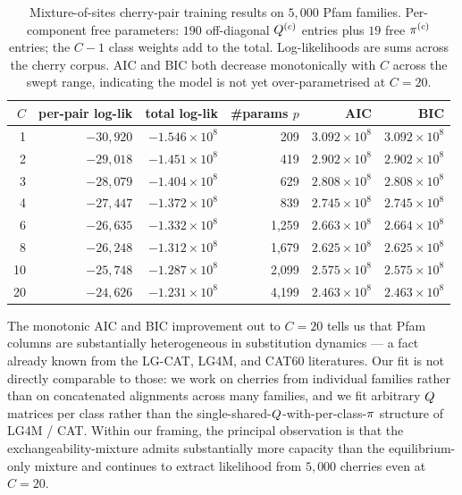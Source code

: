 \begin{table}[ht]
\centering\small
\begin{tabular}{rrrrrr}
\toprule
$C$ & per-pair log-lik & total log-lik & \#params $p$ & AIC & BIC \\
\midrule
1  & $-30{,}920$ & $-1.546 \times 10^8$ & 209  & $3.092 \times 10^8$ & $3.092 \times 10^8$ \\
2  & $-29{,}018$ & $-1.451 \times 10^8$ & 419  & $2.902 \times 10^8$ & $2.902 \times 10^8$ \\
3  & $-28{,}079$ & $-1.404 \times 10^8$ & 629  & $2.808 \times 10^8$ & $2.808 \times 10^8$ \\
4  & $-27{,}447$ & $-1.372 \times 10^8$ & 839  & $2.745 \times 10^8$ & $2.745 \times 10^8$ \\
6  & $-26{,}635$ & $-1.332 \times 10^8$ & 1{,}259 & $2.663 \times 10^8$ & $2.664 \times 10^8$ \\
8  & $-26{,}248$ & $-1.312 \times 10^8$ & 1{,}679 & $2.625 \times 10^8$ & $2.625 \times 10^8$ \\
10 & $-25{,}748$ & $-1.287 \times 10^8$ & 2{,}099 & $2.575 \times 10^8$ & $2.575 \times 10^8$ \\
20 & $-24{,}626$ & $-1.231 \times 10^8$ & 4{,}199 & $2.463 \times 10^8$ & $2.463 \times 10^8$ \\
\bottomrule
\end{tabular}
\caption{Mixture-of-sites cherry-pair training results on $5{,}000$
Pfam families.  Per-component free parameters: $190$ off-diagonal
$Q^{(c)}$ entries plus $19$ free $\pi^{(c)}$ entries; the
$C - 1$ class weights add to the total.  Log-likelihoods are sums
across the cherry corpus.  AIC and BIC both decrease monotonically
with $C$ across the swept range, indicating the model is not yet
over-parametrised at $C = 20$.}
\label{tab:mixture-sites-loglik-sweep}
\end{table}

The monotonic AIC and BIC improvement out to $C = 20$ tells us
that Pfam columns are substantially heterogeneous in
substitution dynamics --- a fact already known from the LG-CAT,
LG4M, and CAT$60$ literatures.  Our fit is not directly comparable to
those: we work on cherries from individual families rather than
on concatenated alignments across many families, and we fit
arbitrary $Q$ matrices per class rather than the
single-shared-$Q$-with-per-class-$\pi$ structure of LG4M /
CAT.  Within our framing, the principal observation is that the
exchangeability-mixture admits substantially more capacity than
the equilibrium-only mixture and continues to extract
likelihood from $5{,}000$ cherries even at $C = 20$.

